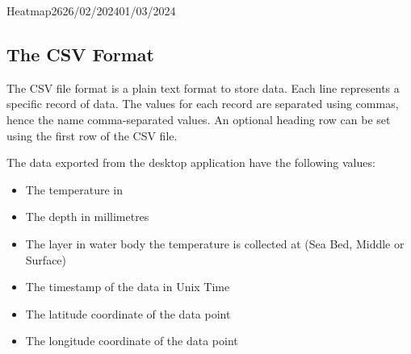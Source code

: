 \documentclass[12pt]{article}
\begin{document}
\begin{logbook-entry}{Heatmap}{26}{26/02/2024}{01/03/2024}
\subsection*{The CSV Format}

The CSV file format is a plain text format to store data.
Each line represents a specific record of data.
The values for each record are separated using commas, hence the name comma-separated values.
An optional heading row can be set using the first row of the CSV file.

The data exported from the desktop application have the following values:

\begin{itemize}
    \item The temperature in 
    \item The depth in millimetres
    \item The layer in water body the temperature is collected at (Sea Bed, Middle or Surface)
    \item The timestamp of the data in Unix Time
    \item The latitude coordinate of the data point
    \item The longitude coordinate of the data point
\end{itemize}
\end{logbook-entry}
\end{document}
